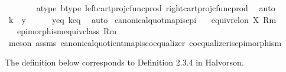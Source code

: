 \begin{isabellebody}
\ \ \ \ \ \ \isamarkupfalse%
\ a{\isacharunderscore}{\kern0pt}type\ b{\isacharunderscore}{\kern0pt}type\ left{\isacharunderscore}{\kern0pt}cart{\isacharunderscore}{\kern0pt}proj{\isacharunderscore}{\kern0pt}cfunc{\isacharunderscore}{\kern0pt}prod\ right{\isacharunderscore}{\kern0pt}cart{\isacharunderscore}{\kern0pt}proj{\isacharunderscore}{\kern0pt}cfunc{\isacharunderscore}{\kern0pt}prod\ \isamarkupfalse%
\ auto\isanewline
\ \ \isamarkupfalse%
\isanewline
\ \ \isamarkupfalse%
\ {\isachardoublequoteopen}k\ {\isacharequal}{\kern0pt}\ y{\isachardoublequoteclose}\isanewline
\ \ \ \ \isamarkupfalse%
\ y{\isacharunderscore}{\kern0pt}eq\ k{\isacharunderscore}{\kern0pt}eq\ \isamarkupfalse%
\ auto\isanewline
{}\isamarkupfalse%
%
\endisatagproof
{\isafoldproof}%
%
\isadelimproof
\isanewline
%
\endisadelimproof
\isanewline
{}\isamarkupfalse%
\ canonical{\isacharunderscore}{\kern0pt}quot{\isacharunderscore}{\kern0pt}map{\isacharunderscore}{\kern0pt}is{\isacharunderscore}{\kern0pt}epi{\isacharcolon}{\kern0pt}\isanewline
\ \ \ {\isachardoublequoteopen}equiv{\isacharunderscore}{\kern0pt}rel{\isacharunderscore}{\kern0pt}on\ X\ {\isacharparenleft}{\kern0pt}R{\isacharcomma}{\kern0pt}m{\isacharparenright}{\kern0pt}{\isachardoublequoteclose}\isanewline
\ \ \ {\isachardoublequoteopen}epimorphism{\isacharparenleft}{\kern0pt}{\isacharparenleft}{\kern0pt}equiv{\isacharunderscore}{\kern0pt}class\ {\isacharparenleft}{\kern0pt}R{\isacharcomma}{\kern0pt}m{\isacharparenright}{\kern0pt}{\isacharparenright}{\kern0pt}{\isacharparenright}{\kern0pt}{\isachardoublequoteclose}\isanewline
%
\isadelimproof
\ \ %
\endisadelimproof
%
\isatagproof
{}\isamarkupfalse%
\ {\isacharparenleft}{\kern0pt}meson\ assms\ canonical{\isacharunderscore}{\kern0pt}quotient{\isacharunderscore}{\kern0pt}map{\isacharunderscore}{\kern0pt}is{\isacharunderscore}{\kern0pt}coequalizer\ coequalizer{\isacharunderscore}{\kern0pt}is{\isacharunderscore}{\kern0pt}epimorphism{\isacharparenright}{\kern0pt}%
\endisatagproof
{\isafoldproof}%
%
\isadelimproof
%
\endisadelimproof
%
\isadelimdocument
%
\endisadelimdocument
%
\isatagdocument
%
\isamarkuptrue%
%
\endisatagdocument
{\isafolddocument}%
%
\isadelimdocument
%
\endisadelimdocument
%
\begin{isamarkuptext}%
The definition below corresponds to Definition 2.3.4 in Halvorson.%
\end{isamarkuptext}\isamarkuptrue%

\end{isabellebody}
